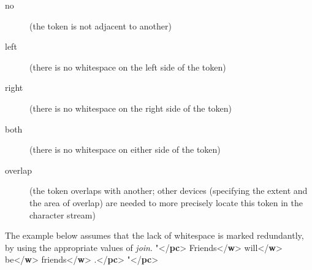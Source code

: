 \begin{reflist}
\begin{sansreflist}
\begin{reflist}
\begin{description}
\item[{no}](the token is not adjacent to another)
\item[{left}](there is no whitespace on the left side of the token)
\item[{right}](there is no whitespace on the right side of the token)
\item[{both}](there is no whitespace on either side of the token)
\item[{overlap}](the token overlaps with another; other devices (specifying the extent and the area of overlap) are needed to more precisely locate this token in the character stream)
\end{description} 
    \item[]The example below assumes that the lack of whitespace is marked redundantly, by using the appropriate values of {\itshape join}.\mbox{}\newline 
{}"{</\textbf{pc}>}\mbox{}\newline 
{}Friends{</\textbf{w}>}\mbox{}\newline 
{}will{</\textbf{w}>}\mbox{}\newline 
{}be{</\textbf{w}>}\mbox{}\newline 
{}friends{</\textbf{w}>}\mbox{}\newline 
{}.{</\textbf{pc}>}\mbox{}\newline 
{}"{</\textbf{pc}>}\mbox{}\newline 

\end{reflist}
\end{sansreflist}
\end{reflist}

